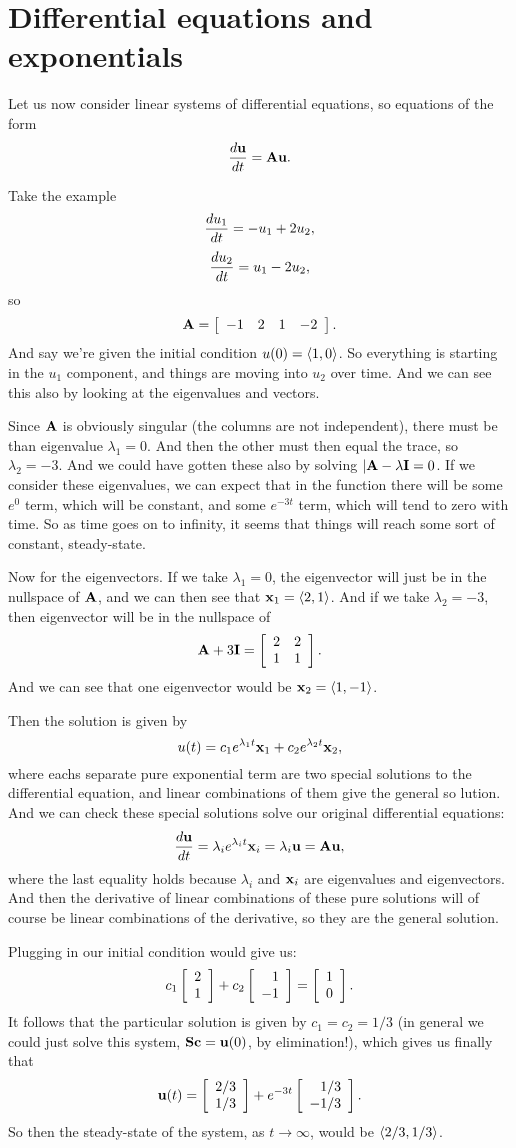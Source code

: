 \section{Differential equations and exponentials}

Let us now consider linear systems of differential equations, so equations of the form
\[ \frac{d\boldsymbol{\mathbf{u}}}{dt} = \boldsymbol{\mathbf{A}}\boldsymbol{\mathbf{u}}. \]

\bex
Take the example
\[ \frac{du_1}{dt} = -u_1 + 2u_2, \]
\[ \frac{du_2}{dt} = u_1 - 2u_2, \]
so
\[ \boldsymbol{\mathbf{A}} = \left[ \begin{array}{rrrrrrrrrrrrrrrrrrrrrrrrr} -1&2&1&-2\\ \end{array} \right]. \]
And say we're given the initial condition $u(0) = \langle 1,0 \rangle$. So everything is starting in the $u_1$ component, and things are moving into $u_2$ over time. And we can see this also by looking at the eigenvalues and vectors.

Since $\boldsymbol{\mathbf{A}}$ is obviously singular (the columns are not independent), there must be than eigenvalue $\lambda_1 = 0$. And then the other must then equal the trace, so $\lambda_2 = -3$. And we could have gotten these also by solving $|\boldsymbol{\mathbf{A}}-\lambda \boldsymbol{\mathbf{I}} = 0$. If we consider these eigenvalues, we can expect that in the function there will be some $e^0$ term, which will be constant, and some $e^{-3t}$ term, which will tend to zero with time. So as time goes on to infinity, it seems that things will reach some sort of constant, steady-state.

Now for the eigenvectors. If we take $\lambda_1 = 0$, the eigenvector will just be in the nullspace of $\boldsymbol{\mathbf{A}}$, and we can then see that $\boldsymbol{\mathbf{x}}_1=\langle 2,1 \rangle$. And if we take $\lambda_2 = -3$, then eigenvector will be in the nullspace of
\[ \boldsymbol{\mathbf{A}} + 3\boldsymbol{\mathbf{I}} = \left[ \begin{array}{rrrrrrrrrrrrrrrrrrrrrrrrr} 2&2\\1&1\\ \end{array} \right]. \]
And we can see that one eigenvector would be $\boldsymbol{\mathbf{x}}_2=\langle 1,-1 \rangle$. 

Then the solution is given by
\[ u(t) = c_1e^{\lambda_1t}\boldsymbol{\mathbf{x}}_1 + c_2e^{\lambda_2t}\boldsymbol{\mathbf{x}}_2, \]
where eachs separate pure exponential term are two special solutions to the differential equation, and linear combinations of them give the general so lution. And we can check these special solutions solve our original differential equations:
\[ \frac{d\boldsymbol{\mathbf{u}}}{dt} = \lambda_i e^{\lambda_it}\boldsymbol{\mathbf{x}}_i = \lambda_i \boldsymbol{\mathbf{u}} = \boldsymbol{\mathbf{A}} \boldsymbol{\mathbf{u}}, \]
where the last equality holds because $\lambda_i$ and $\boldsymbol{\mathbf{x}}_i$ are eigenvalues and eigenvectors. And then the derivative of linear combinations of these pure solutions will of course be linear combinations of the derivative, so they are the general solution. 

Plugging in our initial condition would give us:
\[ c_1 \left[ \begin{array}{rrrrrrrrrrrrrrrrrrrrrrrrr} 2\\1\\ \end{array} \right] + c_2\left[ \begin{array}{rrrrrrrrrrrrrrrrrrrrrrrrr} 1\\-1\\ \end{array} \right] = \left[ \begin{array}{rrrrrrrrrrrrrrrrrrrrrrrrr} 1\\0\\ \end{array} \right]. \]
It follows that the particular solution is given by $c_1 = c_2 = 1/3$ (in general we could just solve this system, $\boldsymbol{\mathbf{S}}\boldsymbol{\mathbf{c}} = \boldsymbol{\mathbf{u}}(0)$, by elimination!), which gives us finally that
\[ \boldsymbol{\mathbf{u}}(t) = \left[ \begin{array}{rrrrrrrrrrrrrrrrrrrrrrrrr} 2/3\\1/3\\ \end{array} \right] + e^{-3t}\left[ \begin{array}{rrrrrrrrrrrrrrrrrrrrrrrrr} 1/3\\-1/3\\ \end{array} \right]. \]
So then the steady-state of the system, as $t \to \infty$, would be $\langle 2/3,1/3 \rangle$. 
\eex

